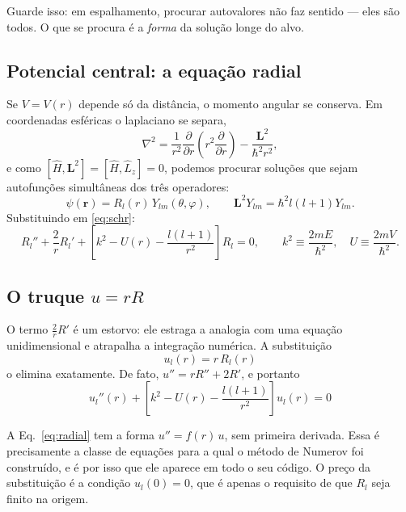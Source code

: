 \documentclass[11pt,a4paper]{article}
\renewcommand{\vec}[1]{\mathbf{#1}}
\begin{document}
Guarde isso: em espalhamento, procurar autovalores não faz sentido — eles são todos.
O que se procura é a \emph{forma} da solução longe do alvo.

\subsection{Potencial central: a equação radial}

Se $V=V(r)$ depende só da distância, o momento angular se conserva. Em coordenadas
esféricas o laplaciano se separa,
\begin{equation}
\nabla^{2} = \frac{1}{r^{2}}\frac{\partial}{\partial r}\!\left(r^{2}\frac{\partial}{\partial r}\right)
- \frac{\vec L^{2}}{\hbar^{2}r^{2}},
\end{equation}
e como $[\hat H,\vec L^{2}]=[\hat H,\hat L_{z}]=0$, podemos procurar soluções que sejam
autofunções simultâneas dos três operadores:
\begin{equation}
\psi(\vec r) = R_{l}(r)\,Y_{lm}(\theta,\varphi),
\qquad \vec L^{2}Y_{lm} = \hbar^{2}l(l+1)Y_{lm}.
\end{equation}
Substituindo em \eqref{eq:schr}:
\begin{equation}
R_{l}'' + \frac{2}{r}R_{l}' + \left[k^{2} - U(r) - \frac{l(l+1)}{r^{2}}\right]R_{l}=0,
\qquad
k^{2}\equiv\frac{2mE}{\hbar^{2}},\quad U\equiv\frac{2mV}{\hbar^{2}}.
\end{equation}

\subsection{O truque \texorpdfstring{$u=rR$}{u = rR}}

O termo $\tfrac{2}{r}R'$ é um estorvo: ele estraga a analogia com uma equação
unidimensional e atrapalha a integração numérica. A substituição
\begin{equation}
\boxed{\;u_{l}(r) = r\,R_{l}(r)\;}
\end{equation}
o elimina exatamente. De fato, $u'' = rR'' + 2R'$, e portanto
\begin{equation}
\boxed{\;u_{l}''(r) + \left[k^{2} - U(r) - \frac{l(l+1)}{r^{2}}\right]u_{l}(r) = 0\;}
\label{eq:radial}
\end{equation}

\begin{ideia}
A Eq.~\eqref{eq:radial} tem a forma $u'' = f(r)\,u$, sem primeira derivada. Essa é
precisamente a classe de equações para a qual o método de Numerov foi construído, e
é por isso que ele aparece em todo o seu código. O preço da substituição é a
condição $u_{l}(0)=0$, que é apenas o requisito de que $R_{l}$ seja finito na origem.
\end{ideia}
\end{document}
